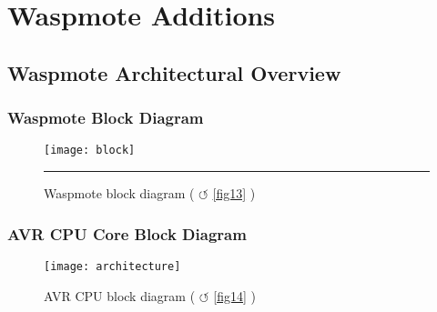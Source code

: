 
\newpage

\pagebreak
\clearpage
\section{Waspmote Additions}
\subsection{Waspmote Architectural Overview}
\label{AppendixB} %
\subsubsection{Waspmote Block Diagram}
\begin{figure}[ht]
\centering
\texttt{[image: block]}
\rule{30em}{0.5pt}
\caption{Waspmote block diagram ( $\circlearrowleft$ \ref{fig13} )}
\label{fig:block}
\end{figure}
\vspace{5cm}
\newpage
\clearpage
\pagebreak
\subsubsection{AVR CPU Core Block Diagram}
\vspace{5cm}
\begin{figure}[ht]
\centering
\texttt{[image: architecture]}
\caption{AVR CPU block diagram ( $\circlearrowleft$ \ref{fig14} )}
\label{fig:architecture}
\end{figure}
\clearpage
\pagebreak

